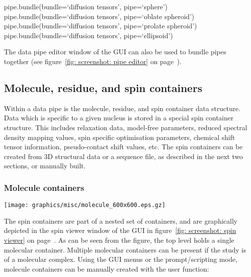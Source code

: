 \begin{exampleenv}
pipe.bundle(bundle=`diffusion tensors', pipe=`sphere') \\
pipe.bundle(bundle=`diffusion tensors', pipe=`oblate spheroid') \\
pipe.bundle(bundle=`diffusion tensors', pipe=`prolate spheroid') \\
pipe.bundle(bundle=`diffusion tensors', pipe=`ellipsoid')
\end{exampleenv}

The data pipe editor window of the GUI can also be used to bundle pipes together (see figure~\ref{fig: screenshot: pipe editor} on page~\pageref{fig: screenshot: pipe editor}).




\subsection{Molecule, residue, and spin containers}

Within a data pipe is the molecule, residue, and spin container data structure.  Data which is specific to a given nucleus is stored in a special spin container structure.  This includes relaxation data, model-free parameters, reduced spectral density mapping values, spin specific optimisation parameters, chemical shift tensor information, pseudo-contact shift values, etc.  The spin containers can be created from 3D structural data or a sequence file, as described in the next two sections, or manually built.



\subsubsection{Molecule containers}

\begin{figure*}[h]
\texttt{[image: graphics/misc/molecule\_600x600.eps.gz]}
\end{figure*}

The spin containers are part of a nested set of containers, and are graphically depicted in the spin viewer window of the GUI in figure~\ref{fig: screenshot: spin viewer} on page~\pageref{fig: screenshot: spin viewer}.  As can be seen from the figure, the top level holds a single molecular container.  Multiple molecular containers can be present if the study is of a molecular complex.  Using the GUI menus or the prompt/scripting mode, molecule containers can be manually created with the user function:

